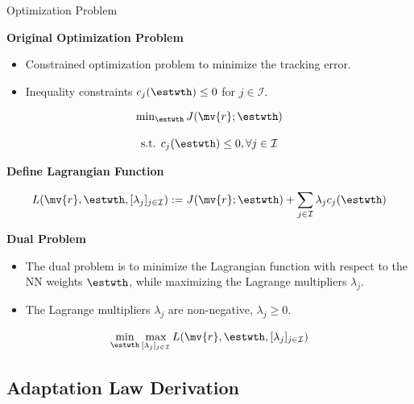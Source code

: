 \documentclass[8pt, aspectratio=169, handout]{beamer}
\begin{document}
\begin{frame}{\insertsubsectionhead}{Optimization Problem}

  \textbf{Original Optimization Problem}

  \begin{itemize}
    \item Constrained optimization problem to minimize the tracking error.
    \item Inequality constraints $c_j(\estwth) \le 0$ for $j\in\mathcal{I}$.
  \end{itemize}

    \begin{equation}\label{eq:opt_problem}
      \begin{matrix}
        \min_{\estwth} J(\mv{r};\estwth)
        \\\ \\
        \text{s.t. } c_{j}(\estwth) 
        \le 
        0
        ,
        \forall j\in\mathcal{I}
      \end{matrix}
    \end{equation}

  \textbf{Define Lagrangian Function}

  \begin{equation}\label{eq:lagrangian}
      L(\mv{r},\estwth,[\lambda_j]_{j\in\mathcal{I}})
      :=
      J(\mv{r};\estwth)
      +
      \sum_{j\in\mathcal{I}} \lambda_j c_j(\estwth)
  \end{equation}

  \textbf{Dual Problem}
  \begin{itemize}
    \item The dual problem is to minimize the Lagrangian function with respect to the NN weights $\estwth$, while maximizing the Lagrange multipliers $\lambda_j$.
    \item The Lagrange multipliers $\lambda_j$ are non-negative, \ie $\lambda_j \ge 0$.
  \end{itemize}

  \begin{equation}\label{eq:dual_problem}
    \min_{\estwth}\max_{[\lambda_j]_{j\in\mathcal{I}}} 
    L(\mv{r},\estwth,[\lambda_j]_{j\in\mathcal{I}})
  \end{equation}

\end{frame}

\subsection{Adaptation Law Derivation}
\end{document}
